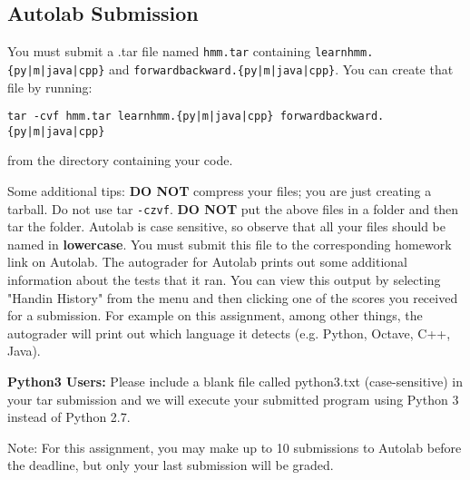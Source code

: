 \documentclass{article}
\begin{document}
\subsection{Autolab Submission}

You must submit a .tar file named {\tt hmm.tar} containing \texttt{learnhmm.\{py|m|java|cpp\}} and \texttt{forwardbackward.\{py|m|java|cpp\}}.
You can create that file by running:
\begin{lstlisting}
tar -cvf hmm.tar learnhmm.{py|m|java|cpp} forwardbackward.{py|m|java|cpp}
\end{lstlisting}
from the directory containing your code.

Some additional tips: {\bf DO NOT} compress your files; you are just
creating a tarball. Do not use tar \texttt{-czvf}.  {\bf DO NOT} put
the above files in a folder and then tar the folder.  Autolab is case
sensitive, so observe that all your files should be named in {\bf
  lowercase}. You must submit this file to the corresponding homework
link on Autolab. The autograder for Autolab prints out some additional 
information about the tests that it ran. You can view this output by selecting 
 "Handin History" from the menu and then clicking one of the scores you 
 received for a submission. For example on this assignment, among other things, 
 the autograder will print out which language it detects (e.g. Python, Octave, C++, Java). 
 
 \begin{notebox}
  {\bf Python3 Users:} Please include a blank file called python3.txt (case-sensitive) in your tar submission and we will execute your submitted program using Python 3 instead of Python 2.7.
 \end{notebox}

Note: For this assignment, you may make up to 10 submissions to Autolab before the deadline, but only your last submission will be graded.
   
\end{document}
